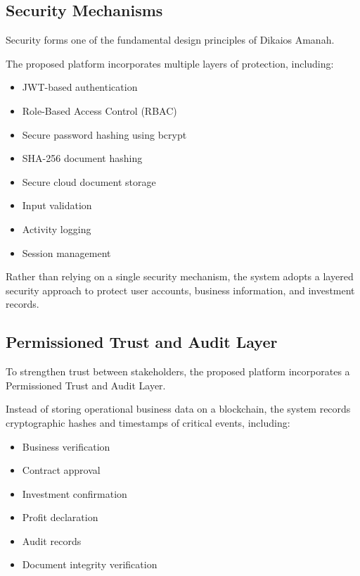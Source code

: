 \subsection{Security Mechanisms}

Security forms one of the fundamental design principles of Dikaios Amanah.

The proposed platform incorporates multiple layers of protection, including:

\begin{itemize}
\item JWT-based authentication
\item Role-Based Access Control (RBAC)
\item Secure password hashing using bcrypt
\item SHA-256 document hashing
\item Secure cloud document storage
\item Input validation
\item Activity logging
\item Session management
\end{itemize}

Rather than relying on a single security mechanism, the system adopts a layered security approach to protect user accounts, business information, and investment records.


\subsection{Permissioned Trust and Audit Layer}

To strengthen trust between stakeholders, the proposed platform incorporates a Permissioned Trust and Audit Layer.

Instead of storing operational business data on a blockchain, the system records cryptographic hashes and timestamps of critical events, including:

\begin{itemize}
\item Business verification
\item Contract approval
\item Investment confirmation
\item Profit declaration
\item Audit records
\item Document integrity verification
\end{itemize}

